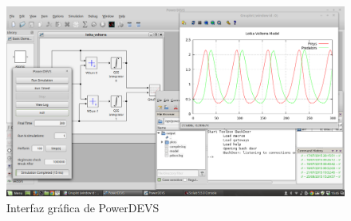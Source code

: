 	\begin{figure}[!htbp]
	  \includegraphics[width=\textwidth]{powerdevs}
	  \caption{Interfaz gráfica de PowerDEVS}
	   \label{fig:powerdevsgui}
	\end{figure}


